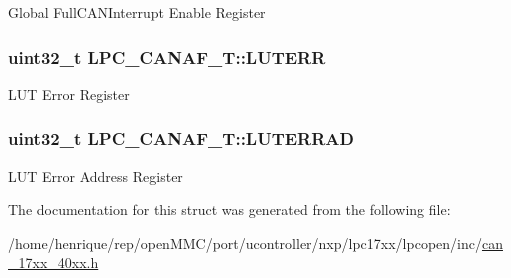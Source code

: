 Global Full\-C\-A\-N\-Interrupt Enable Register \hypertarget{structLPC__CANAF__T_acd4acbf7638e632b78feaccdba530c88}{
\subsubsection[{L\-U\-T\-E\-R\-R}]{ uint32\-\_\-t L\-P\-C\-\_\-\-C\-A\-N\-A\-F\-\_\-\-T\-::\-L\-U\-T\-E\-R\-R}}\label{structLPC__CANAF__T_acd4acbf7638e632b78feaccdba530c88}
L\-U\-T Error Register \hypertarget{structLPC__CANAF__T_ac98a6bb03e4031fbfee27c49b884fddd}{
\subsubsection[{L\-U\-T\-E\-R\-R\-A\-D}]{ uint32\-\_\-t L\-P\-C\-\_\-\-C\-A\-N\-A\-F\-\_\-\-T\-::\-L\-U\-T\-E\-R\-R\-A\-D}}\label{structLPC__CANAF__T_ac98a6bb03e4031fbfee27c49b884fddd}
L\-U\-T Error Address Register 

The documentation for this struct was generated from the following file\-:\begin{DoxyCompactItemize}
\item 
/home/henrique/rep/open\-M\-M\-C/port/ucontroller/nxp/lpc17xx/lpcopen/inc/\hyperlink{can__17xx__40xx_8h}{can\-\_\-17xx\-\_\-40xx.\-h}\end{DoxyCompactItemize}
